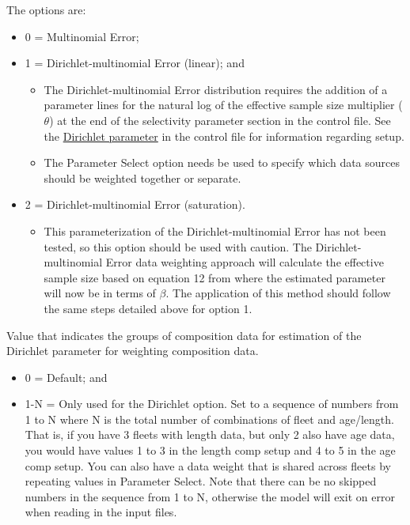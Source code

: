 The options are:
\begin{itemize}
	\item 0 = Multinomial Error;
	\item 1 = Dirichlet-multinomial Error (linear); and
	\begin{itemize}
		\item The Dirichlet-multinomial Error distribution requires the addition of a parameter lines for the natural log of the effective sample size multiplier ($\theta$) at the end of the selectivity parameter section in the control file. See the \hyperlink{Dirichletparameter}{Dirichlet parameter} in the control file for information regarding setup.
		\item The Parameter Select option needs be used to specify which data sources should be weighted together or separate. 
	\end{itemize}
	\item 2 = Dirichlet-multinomial Error (saturation).
	\begin{itemize}
		\item This parameterization of the Dirichlet-multinomial Error has not been tested, so this option should be used with caution. The Dirichlet-multinomial Error data weighting approach will calculate the effective sample size based on equation 12 from \citet{thorson-model-based-2017} where the estimated parameter will now be in terms of $\beta$. The application of this method should follow the same steps detailed above for option 1. 
	\end{itemize}
\end{itemize}


Value that indicates the groups of composition data for estimation of the Dirichlet 
parameter for weighting composition data.

\begin{itemize}
	\item 0 = Default; and
	\item 1-N = Only used for the Dirichlet option. Set to a sequence of numbers from 1 to N where N is the total number of combinations of fleet and age/length. That is, if you have 3 fleets with length data, but only 2 also have age data, you would have values 1 to 3 in the length comp setup and 4 to 5 in the age comp setup. You can also have a data weight that is shared across fleets by repeating values in Parameter Select. Note that there can be no skipped numbers in the sequence from 1 to N, otherwise the model will exit on error when reading in the input files.
\end{itemize}	

